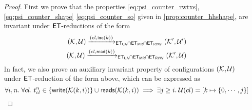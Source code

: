 \begin{proof}
First we prove that the properties \eqref{eq:psi_counter_rwtxs}, \eqref{eq:psi_counter_shape} 
\eqref{eq:psi_counter_so} given in \cref{prop:counter_hhshape}, are invariant under 
$\mathsf{ET}$-reductions of the form 
\begin{align*}
(\mathcal{K}, \mathcal{U}) \xrightarrow{({cl}, \mathsf{inc}(k))}_{\mathsf{ET}_{\mathsf{UA}} \cap \mathsf{ET}_{\mathsf{MR}} \cap \mathsf{ET}_{\mathsf{RYW}}} (\mathcal{K}', \mathcal{U}')\\
(\mathcal{K}, \mathcal{U}) \xrightarrow{({cl}, \mathsf{read}(k))}_{\mathsf{ET}_{\mathsf{UA}} \cap \mathsf{ET}_{\mathsf{MR}} \cap \mathsf{ET}_{\mathsf{RYW}}} (\mathcal{K}', \mathcal{U})
\end{align*}
In fact, we also prove an auxiliary invariant property of configurations $(\mathcal{K}, \mathcal{U})$ under $\mathsf{ET}$-reduction of the form above, 
which can be expressed as 
\begin{equation}
\forall i, n.\; \forall {\ensuremath{cl}}.\; t_{{cl}}^{n} \in \{\mathsf{write}(\mathcal{K}(k, i))\} \cup \mathsf{reads}(\mathcal{K}(k, i)) \implies 
\exists j \geq i.\;\mathcal{U}({cl}) = [k \mapsto \{0, \cdots, j\}] \label{eq:psi_counter_view}
\end{equation} 


\end{proof}

